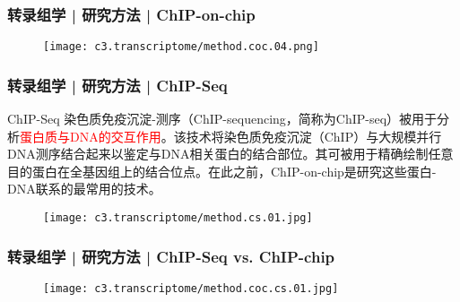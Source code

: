 \begin{frame}
  \frametitle{转录组学 | 研究方法 | ChIP-on-chip}
  \begin{figure}
    \centering
    \texttt{[image: c3.transcriptome/method.coc.04.png]}
  \end{figure}
\end{frame}

\begin{frame}
  \frametitle{转录组学 | 研究方法 | ChIP-Seq}
  {\footnotesize
  \begin{block}{ChIP-Seq}
    染色质免疫沉淀-测序（ChIP-sequencing，简称为ChIP-seq）被用于分析\textcolor{red}{蛋白质与DNA的交互作用}。该技术将染色质免疫沉淀（ChIP）与大规模并行DNA测序结合起来以鉴定与DNA相关蛋白的结合部位。其可被用于精确绘制任意目的蛋白在全基因组上的结合位点。在此之前，ChIP-on-chip是研究这些蛋白-DNA联系的最常用的技术。
  \end{block}
  }
  \begin{figure}
    \centering
    \texttt{[image: c3.transcriptome/method.cs.01.jpg]}
  \end{figure}
\end{frame}

\begin{frame}
  \frametitle{转录组学 | 研究方法 | ChIP-Seq vs. ChIP-chip}
  \begin{figure}
    \centering
    \texttt{[image: c3.transcriptome/method.coc.cs.01.jpg]}
  \end{figure}
\end{frame}
